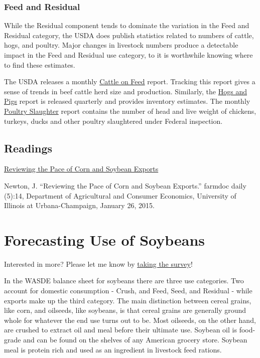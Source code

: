 \documentclass[
  letterpaper,
  DIV=11,
  numbers=noendperiod]{scrreprt}
\begin{document}
\hypertarget{feed-and-residual-1}{%
\subsection{Feed and Residual}\label{feed-and-residual-1}}

While the Residual component tends to dominate the variation in the Feed
and Residual category, the USDA does publish statistics related to
numbers of cattle, hogs, and poultry. Major changes in livestock numbers
produce a detectable impact in the Feed and Residual use category, to it
is worthwhile knowing where to find these estimates.

The USDA releases a monthly
\href{http://usda.mannlib.cornell.edu/MannUsda/viewDocumentInfo.do?documentID=1020}{Cattle
on Feed} report. Tracking this report gives a sense of trends in beef
cattle herd size and production. Similarly, the
\href{http://usda.mannlib.cornell.edu/MannUsda/viewDocumentInfo.do?documentID=1086}{Hogs
and Pigs} report is released quarterly and provides inventory estimates.
The monthly
\href{https://usda.mannlib.cornell.edu/MannUsda/viewDocumentInfo.do?documentID=1131}{Poultry
Slaughter} report contains the number of head and live weight of
chickens, turkeys, ducks and other poultry slaughtered under Federal
inspection.

\hypertarget{readings-3}{%
\section{Readings}\label{readings-3}}

\href{http://farmdocdaily.illinois.edu/2015/01/reviewing-pace-of-corn-and-soybean-exports.html}{Reviewing
the Pace of Corn and Soybean Exports}

Newton, J. ``Reviewing the Pace of Corn and Soybean Exports.'' farmdoc
daily (5):14, Department of Agricultural and Consumer Economics,
University of Illinois at Urbana-Champaign, January 26, 2015.


\hypertarget{forecasting-use-of-soybeans}{%
\chapter{Forecasting Use of
Soybeans}\label{forecasting-use-of-soybeans}}

{Interested in more? Please let me know by}
\href{https://forms.gle/Q3VByCQZHjfQSy9D7}{taking the survey}!

In the WASDE balance sheet for soybeans there are three use categories.
Two account for domestic consumption - Crush, and Feed, Seed, and
Residual - while exports make up the third category. The main
distinction between cereal grains, like corn, and oilseeds, like
soybeans, is that cereal grains are generally ground whole for whatever
the end use turns out to be. Most oilseeds, on the other hand, are
crushed to extract oil and meal before their ultimate use. Soybean oil
is food-grade and can be found on the shelves of any American grocery
store. Soybean meal is protein rich and used as an ingredient in
livestock feed rations.
\end{document}
